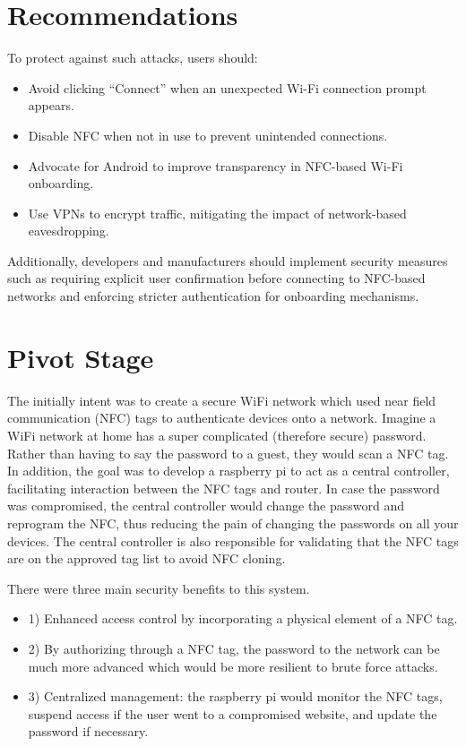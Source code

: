 \documentclass[sigconf]{acmart}
\begin{document}
\section{Recommendations}
To protect against such attacks, users should:
\begin{itemize}
    \item Avoid clicking “Connect” when an unexpected Wi-Fi connection prompt appears.
    \item Disable NFC when not in use to prevent unintended connections.
    \item Advocate for Android to improve transparency in NFC-based Wi-Fi onboarding.
    \item Use VPNs to encrypt traffic, mitigating the impact of network-based eavesdropping. \cite{sniffing}
\end{itemize}

Additionally, developers and manufacturers should implement security measures such as requiring explicit user confirmation before connecting to NFC-based networks and enforcing stricter authentication for onboarding mechanisms.

\section{Pivot Stage}

The initially intent was to create a secure WiFi network which used near field communication (NFC) tags to authenticate devices onto a network. Imagine a WiFi network at home has a super complicated (therefore secure) password. Rather than having to say the password to a guest, they would scan a NFC tag. In addition, the goal was to develop a raspberry pi to act as a central controller, facilitating interaction between the NFC tags and router. In case the password was compromised, the central controller would change the password and reprogram the NFC, thus reducing the pain of changing the passwords on all your devices. The central controller is also responsible for validating that the NFC tags are on the approved tag list to avoid NFC cloning. \newline

There were three main security benefits to this system. 

\begin{itemize}
    \item 1) Enhanced access control by incorporating a physical element of a NFC tag. 
    \item 2) By authorizing through a NFC tag, the password to the network can be much more advanced which would be more resilient to brute force attacks. 
    \item 3) Centralized management: the raspberry pi would monitor the NFC tags, suspend access if the user went to a compromised website, and update the password if necessary. 
\end{itemize}
\end{document}

